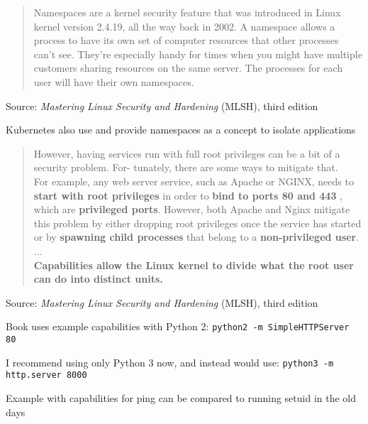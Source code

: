 \documentclass[Screen16to9,17pt]{foils}
\begin{document}

\begin{quote}
Namespaces are a kernel security feature that was introduced in Linux kernel version 2.4.19, all the way back in 2002. A namespace allows a process to have its own set of computer resources that other processes can’t see. They’re especially handy for times when you might have multiple customers sharing resources on the same server. The processes for each user will have their own namespaces.
\end{quote}
Source: \emph{Mastering Linux Security and Hardening} (MLSH), third edition

\begin{list2}
\item Kubernetes also use and provide namespaces as a concept to isolate applications
\end{list2}




\begin{quote}
However, having services run with full root privileges can be a bit of a security problem. For-
tunately, there are some ways to mitigate that.\\
For example, any web server service, such as Apache or NGINX, needs to {\bf start with root privileges} in order to {\bf bind to ports 80 and 443} , which are {\bf privileged ports}. However, both Apache and Nginx mitigate this problem by either dropping root privileges once the service has started or by {\bf spawning child processes} that belong to a {\bf non-privileged user}.\\
...\\
{\bf Capabilities allow the Linux kernel to divide what the root user can do into distinct units.}
\end{quote}
Source: \emph{Mastering Linux Security and Hardening} (MLSH), third edition

\begin{list2}
\item Book uses example capabilities with Python 2: \verb+python2 -m SimpleHTTPServer 80+
\item I recommend using only Python 3 now, and instead would use: \verb+python3 -m http.server 8000+
\item Example with capabilities for ping can be compared to running setuid in the old days
\end{list2}
\end{document}
